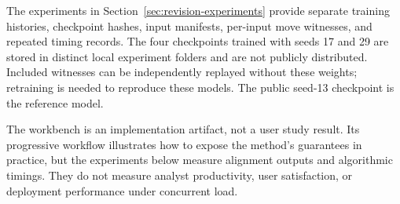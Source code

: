 \begin{revised}The experiments in Section~\ref{sec:revision-experiments} provide separate training histories, checkpoint hashes, input manifests, per-input move witnesses, and repeated timing records. The four checkpoints trained with seeds 17 and 29 are stored in distinct local experiment folders and are not publicly distributed. Included witnesses can be independently replayed without these weights; retraining is needed to reproduce these models. The public seed-13 checkpoint is the reference model.\end{revised}

The workbench is an implementation artifact, not a user study result. Its progressive workflow illustrates how to expose the method's guarantees in practice, but the experiments below measure alignment outputs and algorithmic timings. They do not measure analyst productivity, user satisfaction, or deployment performance under concurrent load.
